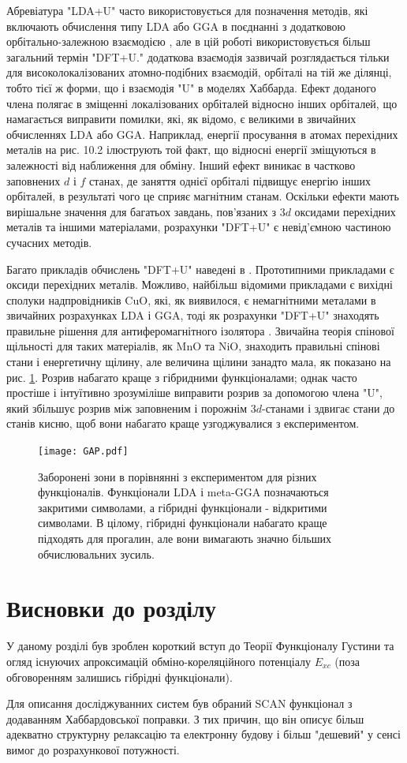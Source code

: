 Абревіатура "LDA+U" часто використовується для позначення методів, які включають обчислення типу LDA або GGA в поєднанні з додатковою орбітально-залежною взаємодією \cite{PhysRevB.44, Anisimov1997}, але в цій роботі використовується більш загальний термін "DFT+U." додаткова взаємодія зазвичай розглядається тільки для високолокалізованих атомно-подібних взаємодій, орбіталі на тій же ділянці, тобто тієї ж форми, що і взаємодія "U" в моделях Хаббарда. Ефект доданого члена полягає в зміщенні локалізованих орбіталей відносно інших орбіталей, що намагається виправити помилки, які, як відомо, є великими в звичайних обчисленнях LDA або GGA. Наприклад, енергії просування в атомах перехідних металів на рис. 10.2 ілюструють той факт, що відносні енергії зміщуються в залежності від наближення для обміну. Інший ефект виникає в частково заповнених $d$ і $f$ станах, де заняття однієї орбіталі підвищує енергію інших орбіталей, в результаті чого це сприяє магнітним станам. Оскільки ефекти мають вирішальне значення для багатьох завдань, пов'язаних з $3d$ оксидами перехідних металів та іншими матеріалами, розрахунки "DFT+U" є невід'ємною частиною сучасних методів.

Багато прикладів обчислень "DFT+U" наведені в \cite{Anisimov1997}. Прототипними прикладами є оксиди перехідних металів. Можливо, найбільш відомими прикладами є вихідні сполуки надпровідників CuO, які, як виявилося, є немагнітними металами в звичайних розрахунках LDA і GGA, тоді як розрахунки "DFT+U" знаходять правильне рішення для антиферомагнітного ізолятора \cite{Anisimov1997}. Звичайна теорія спінової щільності для таких матеріалів, як MnO та NiO, знаходить правильні спінові стани і енергетичну щілину, але величина щілини занадто мала, як показано на рис. \ref{fig:GAP}. Розрив набагато краще з гібридними функціоналами; однак часто простіше і інтуїтивно зрозуміліше виправити розрив за допомогою члена "U", який збільшує розрив між заповненим і порожнім $3d$-станами і здвигає стани до станів кисню, щоб вони набагато краще узгоджувалися з експериментом.

\begin{figure}[H]
	\centering
	\texttt{[image: GAP.pdf]}
	\caption{Заборонені зони в порівнянні з експериментом для різних функціоналів. Функціонали LDA і meta-GGA позначаються закритими символами, а гібридні функціонали - відкритими символами. В цілому, гібридні функціонали набагато краще підходять для прогалин, але вони вимагають значно більших обчислювальних зусиль.}
	\label{fig:GAP}
\end{figure}

\section{Висновки до розділу}
У даному розділі був зроблен короткий вступ до Теорії Функціоналу Густини та огляд існуючих апроксимацій обміно-кореляційного потенціалу $E_{xc}$ (поза обговоренням залишись гібрідні функціонали). 

Для описання досліджуванних систем був обраний SCAN функціонал з додаванням Хаббардовської поправки. З тих причин, що він описує більш адекватно структурну релаксацію та електронну будову і більш "дешевий" у сенсі вимог до розрахункової потужності.    



